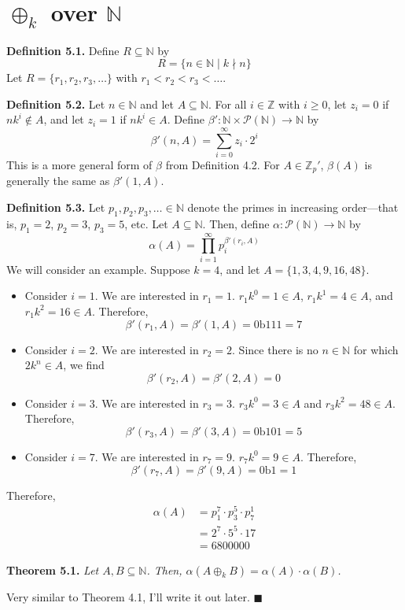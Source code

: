\documentclass{article}
\newcommand{\zee}{\mathbb{Z}}
\newcommand{\N}{\mathbb{N}}
\begin{document}
\setcounter{section}{4}
\section{$\oplus_k$ over $\N$}

\textbf{Definition 5.1.} Define $R \subseteq \N$ by
\[R = \{n \in \N \mid k \nmid n\}\]
Let $R = \{r_1, r_2, r_3, \ldots\}$ with $r_1 < r_2 < r_3 < \ldots$.

\textbf{Definition 5.2.} Let $n \in \N$ and let $A \subseteq \N$.
For all $i \in \zee$
with $i \geq 0$, let $z_i = 0$ if $nk^i \not\in A$,
and let $z_i = 1$ if $nk^i \in A$.
Define $\beta': \N \times \mathcal{P}(\N) \rightarrow \N$
by
\[\beta'(n, A) = \sum_{i = 0}^\infty z_i \cdot 2^{i}\]
This is a more general form of $\beta$ from Definition 4.2.
For $A \in \zee_p'$, $\beta(A)$ is generally
the same as $\beta'(1, A)$.

\textbf{Definition 5.3.} Let
$p_1, p_2, p_3, \ldots \in \N$ denote the primes in increasing
order---that is, $p_1 = 2$, $p_2 = 3$, $p_3 = 5$, etc.
Let $A \subseteq \N$.
Then, define $\alpha: \mathcal{P}(\N) \rightarrow \N$ by
\[\alpha(A) = \prod_{i=1}^\infty p_i^{\beta'(r_i, A)}\]
We will consider an example. Suppose $k = 4$, and let
$A = \{1, 3, 4, 9, 16, 48\}$.
\begin{itemize}
    \item Consider $i = 1$. We are interested in $r_1 = 1$.
    $r_1k^0 = 1 \in A$,
    $r_1k^1 = 4 \in A$, and $r_1k^2 = 16 \in A$.
    Therefore,
    \[\beta'(r_1, A) = \beta'(1, A) = \text{0b111} = 7\]
    \item Consider $i = 2$. We are interested in $r_2 = 2$.
    Since there is no $n \in \N$ for which $2k^n \in A$,
    we find
    \[\beta'(r_2, A) = \beta'(2, A) = 0\]
    \item Consider $i = 3$. We are interested in $r_3 = 3$.
    $r_3k^0 = 3 \in A$ and $r_3k^2 = 48 \in A$.
    Therefore,
    \[\beta'(r_3, A) = \beta'(3, A) = \text{0b101} = 5\]
    \item Consider $i = 7$. We are interested in $r_7 = 9$.
    $r_7k^0 = 9 \in A$. Therefore,
    \[\beta'(r_7, A) = \beta'(9, A) = \text{0b1} = 1\]
\end{itemize}
Therefore,
\[\begin{split}
    \alpha(A) &= p_1^7 \cdot p_3^5 \cdot p_7^1 \\
    &= 2^7 \cdot 5^5 \cdot 17 \\
    &= 6800000
\end{split}\]

\textbf{Theorem 5.1.} \textit{Let $A, B \subseteq \N$.
Then, $\alpha(A \oplus_k B) = \alpha(A) \cdot \alpha(B)$.}

Very similar to Theorem 4.1, I'll write it out later.
$\blacksquare$
\end{document}
